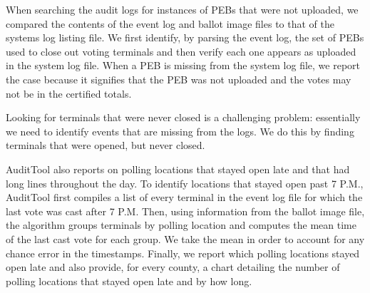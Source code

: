 \documentclass[letterpaper,twocolumn,10pt]{article}
\begin{document}
When searching the audit logs for instances of PEBs that were not uploaded, we
compared the contents of the event log and ballot image files to that of the
systems log listing file. We first identify, by parsing the event log, the set
of PEBs used to close out voting terminals and then verify each one appears as
uploaded in the system log file. When a PEB is missing from the system log file,
we report the case because it signifies that the PEB was not uploaded and the
votes may not be in the certified totals.  

Looking for terminals that were never closed is a challenging problem:
essentially we need to identify events that are missing from the logs. We do
this by finding terminals that were opened, but never closed.  

AuditTool also reports on polling locations that stayed open late and that had
long lines throughout the day. To identify locations that stayed open past 7
P.M., AuditTool first compiles a list of every terminal in the event log file
for which the last vote was cast after 7 P.M. Then, using information from the
ballot image file, the algorithm groups terminals by polling location and
computes the mean time of the last cast vote for each group. We take the mean in
order to account for any chance error in the timestamps. Finally, we report which
polling locations stayed open late and also provide, for every county, a chart
detailing the number of polling locations that stayed open late and by how
long. 
	 		
\end{document}
